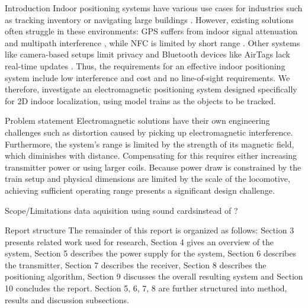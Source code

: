 \newpage
\begin{section}{Introduction}
    Indoor positioning systems have various use cases for industries such as tracking inventory or navigating large buildings \cite{Wang2026}.
    However, existing solutions often struggle in these environments: GPS suffers from indoor signal attenuation and multipath interference \cite{Sysnav2024}, while NFC is limited by short range \cite{Workm82024}.
    Other systems like camera-based setups limit privacy \cite{Chelani2025} and Bluetooth devices like AirTags lack real-time updates \cite{VandeVelde2024}. 
    Thus, the requirements for an effective indoor positioning system include low interference and cost and no line-of-sight requirements.
    We therefore, investigate an electromagnetic positioning system designed specifically for 2D indoor localization, using model trains as the objects to be tracked.

    \begin{subsection}{Problem statement}
        Electromagnetic solutions have their own engineering challenges such as distortion caused by picking up  electromagnetic interference.
        Furthermore, the system's range is limited by the strength of its magnetic field, which diminishes with distance. 
        Compensating for this requires either increasing transmitter power or using larger coils. 
        Because power draw is constrained by the train setup and physical dimensions are limited by the scale of the locomotive, achieving sufficient operating range presents a significant design challenge.
    \end{subsection}
    
    \begin{subsection}{Scope/Limitations}
        data aquisition using sound cardsinstead of ?
    \end{subsection}
  
    \begin{subsection}{Report structure}
        The remainder of this report is organized as follows: Section 3 presents related work used for research, Section 4 gives an overview of the system, Section 5 describes the power supply for the system, Section 6 describes the transmitter, Section 7 describes the receiver, Section 8 describes the positioning algorithm, Section 9 discusses the overall resulting system and Section 10 concludes the report.
        Section 5, 6, 7, 8 are further structured into method, results and discussion subsections. 
    \end{subsection}
    
\end{section}